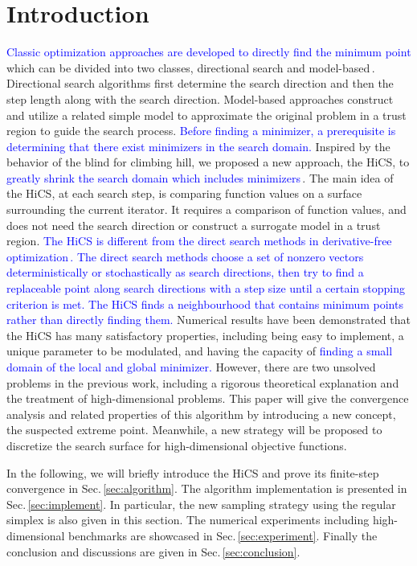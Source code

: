\documentclass[mathpazo]{csam}
\theoremstyle{remark}
\begin{document}
\section{Introduction}
\label{sec:intro}

\textcolor{blue}{
Classic optimization approaches are developed to directly find the minimum point}
which can be divided into two
classes, directional search and model-based\,\cite{sun2006optimization,
nocedal2006numerical, conn2009introduction}.  Directional search algorithms first
determine the search direction and then the step length along with the search
direction. Model-based approaches construct and utilize a related simple model to
approximate the original problem in a trust region to guide the search process. 
\textcolor{blue}{
Before finding a minimizer, a prerequisite is 
determining that there exist minimizers in the search domain.
}
Inspired by the behavior of the blind for climbing hill, we
proposed a new approach, the HiCS, to \textcolor{blue}{greatly shrink the search
domain which includes minimizers}\,\cite{huang2017hill}.
The main idea of the HiCS, at each search step, is comparing
function values on a surface surrounding the current iterator.
It requires a comparison of function values, and does not need the search direction
or construct a surrogate model in a trust region.
\textcolor{blue}{
The HiCS is different from the direct search methods in
derivative-free optimization\,\cite{kolda2003optimization, conn2009introduction}. The
direct search methods choose a set of nonzero vectors deterministically or
stochastically as search directions, then try to find a replaceable point along
search directions with a step size until a certain stopping criterion is met.  The
HiCS finds a neighbourhood that contains minimum points rather than directly finding them. 
}
Numerical results have been demonstrated that the HiCS has many 
satisfactory properties, including being easy to implement,
a unique parameter to be modulated, and having the capacity
of \textcolor{blue}{finding a small domain of the local and global minimizer. }
However, there are two unsolved problems in the
previous work, including a rigorous theoretical explanation and
the treatment of high-dimensional problems.
This paper will give the convergence analysis and related
properties of this algorithm by introducing a new concept, the suspected extreme
point.
Meanwhile, a new strategy will be proposed to discretize the search
surface for high-dimensional objective functions.

In the following, we will briefly introduce the HiCS and
prove its finite-step convergence in Sec.\,\ref{sec:algorithm}. 
The algorithm implementation is presented in Sec.\,\ref{sec:implement}.
In particular, the new sampling strategy using the regular simplex is
also given in this section.
The numerical experiments including high-dimensional benchmarks
are showcased in Sec.\,\ref{sec:experiment}. 
Finally the conclusion and discussions are given in Sec.\,\ref{sec:conclusion}.
\end{document}
